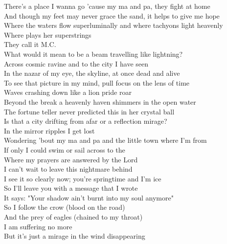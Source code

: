 \label{album:flight-b741}



There's a place I wanna go 'cause my ma and pa, they fight at home \\
And though my feet may never grace the sand, it helps to give me hope \\
Where the waters flow superluminally and where tachyons light heavenly \\
Where  plays her superstrings \\
They call it M.C. \\

What would it mean to be a beam travelling like lightning? \\
Across cosmic ravine and to the city I have seen \\
In the nazar of my eye, the skyline, at once dead and alive \\
To see that picture in my mind, pull focus on the lens of time \\

Waves crashing down like a lion pride roar \\
Beyond the break a heavenly haven shimmers in the open water \\
The fortune teller never predicted this in her crystal ball \\
Is that a city drifting from afar or a reflection mirage? \\

In the mirror ripples I get lost \\
Wondering 'bout my ma and pa and the little town where I'm from \\
If only I could swim or sail across to the  \\
Where my prayers are answered by the Lord \\

I can't wait to leave this nightmare behind \\
I see it so clearly now; you're springtime and I'm ice \\
So I'll leave you with a message that I wrote \\
It says: "Your shadow ain't burnt into my soul anymore" \\

So I follow the crow (blood on the road) \\
And the prey of eagles (chained to my throat) \\
I am suffering no more \\
But it's just a mirage in the wind disappearing \\


